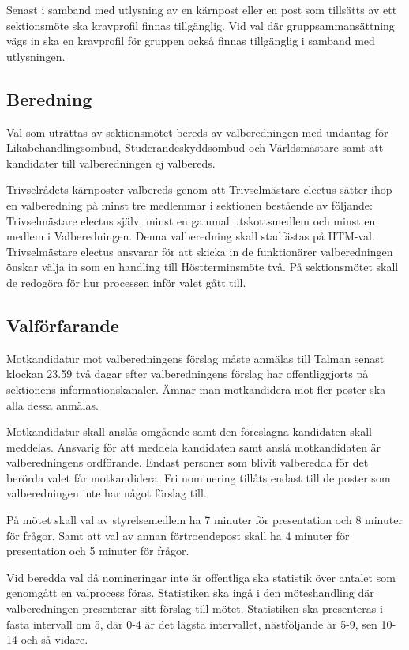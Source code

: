 \documentclass{dsekprotokoll}
\begin{document}
Senast i samband med utlysning av en kärnpost eller en post som tillsätts av ett sektionsmöte ska kravprofil finnas tillgänglig. Vid val där gruppsammansättning vägs in ska en kravprofil för gruppen också finnas
tillgänglig i samband med utlysningen.

\subsection{Beredning}
Val som uträttas av sektionsmötet bereds av valberedningen med undantag för Likabehandlingsombud, Studerandeskyddsombud och Världsmästare samt att kandidater till valberedningen ej valbereds.

Trivselrådets kärnposter valbereds genom att Trivselmästare electus sätter ihop en valberedning på minst tre medlemmar i sektionen bestående av följande: Trivselmästare electus själv, minst en gammal utskottsmedlem och minst en medlem i Valberedningen. Denna valberedning skall stadfästas på HTM-val. Trivselmästare electus ansvarar för att skicka in de funktionärer valberedningen önskar välja in som en handling till Höstterminsmöte två. På sektionsmötet skall de redogöra för hur processen inför valet gått till.

\subsection{Valförfarande}
Motkandidatur mot valberedningens förslag måste anmälas till Talman senast klockan 23.59 två dagar efter valberedningens förslag har offentliggjorts på sektionens informationskanaler. Ämnar man motkandidera mot fler poster ska alla dessa anmälas.

Motkandidatur skall anslås omgående samt den föreslagna kandidaten skall meddelas. Ansvarig för att meddela kandidaten samt anslå motkandidaten är valberedningens ordförande. Endast personer som blivit valberedda för det berörda valet får motkandidera.
Fri nominering tillåts endast till de poster som valberedningen inte har något förslag till.

På mötet skall val av styrelsemedlem ha 7 minuter för presentation och 8 minuter för frågor. Samt att val av annan förtroendepost skall ha 4 minuter för presentation och 5 minuter för frågor.

Vid beredda val då nomineringar inte är offentliga ska statistik över antalet som genomgått en valprocess föras. Statistiken ska ingå i den möteshandling där valberedningen presenterar sitt förslag till mötet. Statistiken ska presenteras i fasta intervall om 5, där 0-4
är det lägsta intervallet, nästföljande är 5-9, sen 10-14 och så
vidare.
\end{document}
